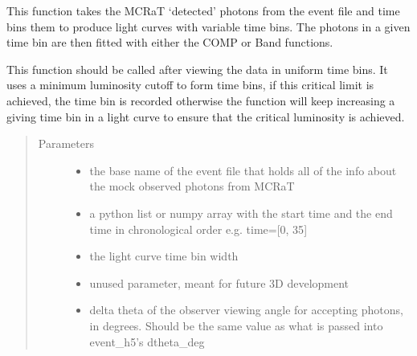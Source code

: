 \documentclass[letterpaper,10pt,english]{sphinxmanual}
\begin{document}
\begin{fulllineitems}
\label{\detokenize{read_process_files:read_process_files.lcur_param_var_t}}
This function takes the MCRaT ‘detected’ photons from the event file and time bins them to produce light curves with
variable time bins. The photons in a given time bin are then fitted with either the COMP or Band functions.

This function should be called after viewing the data in uniform time bins. It uses a minimum luminosity cutoff to
form time bins, if this critical limit is achieved, the time bin is recorded otherwise the function will keep
increasing a giving time bin in a light curve to ensure that the critical luminosity is achieved.
\begin{quote}\begin{description}
\item[{Parameters}] \leavevmode\begin{itemize}
\item {} 
 \textendash{} the base name of the event file that holds all of the info about the mock observed photons
from MCRaT

\item {} 
 \textendash{} a python list or numpy array with the start time and the end time in chronological order e.g. time={[}0, 35{]}

\item {} 
 \textendash{} the light curve time bin width

\item {} 
 \textendash{} unused parameter, meant for future 3D development

\item {} 
 \textendash{} delta theta of the observer viewing angle for accepting photons, in degrees. Should be the same
value as what is passed into event\_h5’s dtheta\_deg


\end{itemize}
\end{description}
\end{quote}
\end{fulllineitems}
\end{document}
